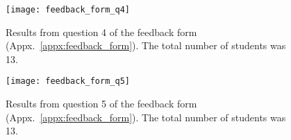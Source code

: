 \begin{appendices}
\begin{figure}[htp]
	\centering
	\texttt{[image: feedback\_form\_q4]}
	\caption[Results from feedback form question 4]{Results from question 4 of the feedback form (Appx.~\ref{appx:feedback_form}). The total number of students was 13.}
	\label{fig:feedback_form_q4}
\end{figure}

\begin{figure}[htp]
	\centering
	\texttt{[image: feedback\_form\_q5]}
	\caption[Results from feedback form question 5]{Results from question 5 of the feedback form (Appx.~\ref{appx:feedback_form}). The total number of students was 13.}
	\label{fig:feedback_form_q5}
\end{figure}












\end{appendices}